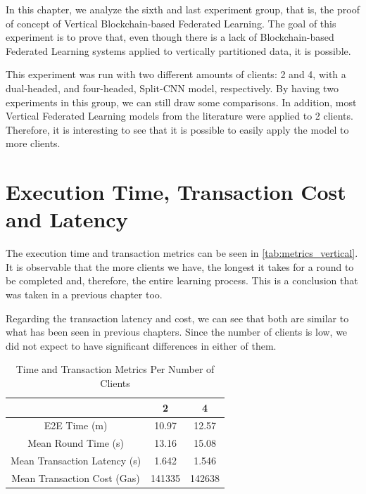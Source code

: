 In this chapter, we analyze the sixth and last experiment group, that is, the proof of concept of Vertical Blockchain-based Federated Learning. The goal of this experiment is to prove that, even though there is a lack of Blockchain-based Federated Learning systems applied to vertically partitioned data, it is possible.

This experiment was run with two different amounts of clients: 2 and 4, with a dual-headed, and four-headed, Split-CNN model, respectively. By having two experiments in this group, we can still draw some comparisons. In addition, most Vertical Federated Learning models from the literature were applied to 2 clients. Therefore, it is interesting to see that it is possible to easily apply the model to more clients.

\section{Execution Time, Transaction Cost and Latency}

The execution time and transaction metrics can be seen in \autoref{tab:metrics_vertical}. It is observable that the more clients we have, the longest it takes for a round to be completed and, therefore, the entire learning process. This is a conclusion that was taken in a previous chapter too.

Regarding the transaction latency and cost, we can see that both are similar to what has been seen in previous chapters. Since the number of clients is low, we did not expect to have significant differences in either of them.

\begin{table}[!ht]
\begin{tabular}{c|c|c} \hline \hline
                                & 2             & 4             \\ \hline \hline
E2E Time (m)                    & 10.97	        & 12.57         \\ \hline
Mean Round Time (s)             & 13.16	        & 15.08         \\ \hline
Mean Transaction Latency (s)    & 1.642	        & 1.546         \\ \hline
Mean Transaction Cost (Gas)     & 141335        & 142638        \\ \hline
\end{tabular}
\caption{Time and Transaction Metrics Per Number of Clients}
\label{tab:metrics_vertical}
\end{table}

